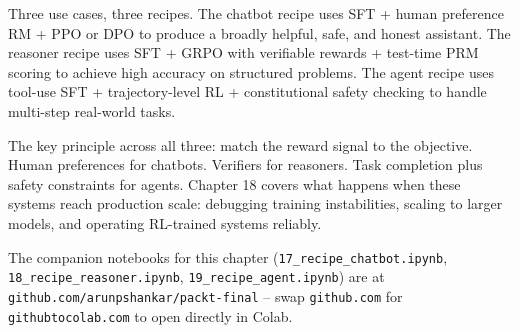 \begin{chapterenv}
Three use cases, three recipes. The chatbot recipe uses SFT + human preference RM + PPO or DPO to produce a broadly helpful, safe, and honest assistant. The reasoner recipe uses SFT + GRPO with verifiable rewards + test-time PRM scoring to achieve high accuracy on structured problems. The agent recipe uses tool-use SFT + trajectory-level RL + constitutional safety checking to handle multi-step real-world tasks.

The key principle across all three: match the reward signal to the objective. Human preferences for chatbots. Verifiers for reasoners. Task completion plus safety constraints for agents. Chapter 18 covers what happens when these systems reach production scale: debugging training instabilities, scaling to larger models, and operating RL-trained systems reliably.


The companion notebooks for this chapter (\texttt{17\_recipe\_chatbot.ipynb}, \texttt{18\_recipe\_reasoner.ipynb}, \texttt{19\_recipe\_agent.ipynb}) are at \texttt{github.com/arunpshankar/packt-final} -- swap \texttt{github.com} for \texttt{githubtocolab.com} to open directly in Colab.

\end{chapterenv}
